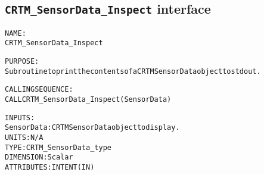 \subsection{\texttt{CRTM\_SensorData\_Inspect} interface}
  \label{sec:CRTM_SensorData_Inspect_interface}
  \begin{alltt}
 
  NAME:
        CRTM_SensorData_Inspect
 
  PURPOSE:
        Subroutine to print the contents of a CRTM SensorData object to stdout.
 
  CALLING SEQUENCE:
        CALL CRTM_SensorData_Inspect( SensorData )
 
  INPUTS:
        SensorData:    CRTM SensorData object to display.
                       UNITS:      N/A
                       TYPE:       CRTM_SensorData_type
                       DIMENSION:  Scalar
                       ATTRIBUTES: INTENT(IN)
 
  \end{alltt}

